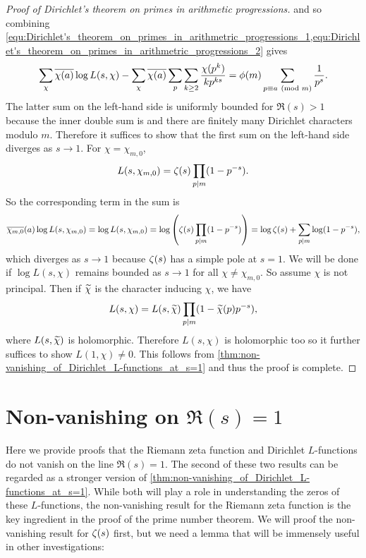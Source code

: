 \begin{proof}[Proof of Dirichlet's theorem on primes in arithmetic progressions]
          and so combining \cref{equ:Dirichlet's_theorem_on_primes_in_arithmetric_progressions_1,equ:Dirichlet's_theorem_on_primes_in_arithmetric_progressions_2} gives
          \[
            \sum_{\chi}\overline{\chi(a)}\log L(s,\chi)-\sum_{\chi}\overline{\chi(a)}\sum_{p}\sum_{k \ge 2}\frac{\chi(p^{k})}{kp^{ks}} = \phi(m)\sum_{p \equiv{a} \ \left(\text{mod }m\right)}\frac{1}{p^{s}}.
          \]
          The latter sum on the left-hand side is uniformly bounded for $\Re(s) > 1$ because the inner double sum is and there are finitely many Dirichlet characters modulo $m$. Therefore it suffices to show that the first sum on the left-hand side diverges as $s \to 1$. For $\chi = \chi_{m,0}$,
          \[
            L(s,\chi_{m,0}) = \zeta(s)\prod_{p \mid m}(1-p^{-s}).
          \]
          So the corresponding term in the sum is
          \[
            \overline{\chi_{m,0}}(a)\log L(s,\chi_{m,0}) = \log L(s,\chi_{m,0}) = \log\left(\zeta(s)\prod_{p \mid m}(1-p^{-s})\right) = \log\zeta(s)+\sum_{p \mid m}\log(1-p^{-s}),
          \]
          which diverges as $s \to 1$ because $\zeta(s)$ has a simple pole at $s = 1$. We will be done if $\log L(s,\chi)$ remains bounded as $s \to 1$ for all $\chi \neq \chi_{m,0}$. So assume $\chi$ is not principal. Then if $\widetilde{\chi}$ is the character inducing $\chi$, we have
          \[
            L(s,\chi) = L(s,\widetilde{\chi})\prod_{p \mid m}(1-\widetilde{\chi}(p)p^{-s}),
          \]
          where $L(s,\widetilde{\chi})$ is holomorphic. Therefore $L(s,\chi)$ is holomorphic too so it further suffices to show $L(1,\chi) \neq 0$. This follows from \cref{thm:non-vanishing_of_Dirichlet_L-functions_at_s=1} and thus the proof is complete.
      \end{proof}
    \section{Non-vanishing on \texorpdfstring{$\Re(s) = 1$}{\Re(s) = 1}}
      Here we provide proofs that the Riemann zeta function and Dirichlet $L$-functions do not vanish on the line $\Re(s) = 1$. The second of these two results can be regarded as a stronger version of \cref{thm:non-vanishing_of_Dirichlet_L-functions_at_s=1}. While both will play a role in understanding the zeros of these $L$-functions, the non-vanishing result for the Riemann zeta function is the key ingredient in the proof of the prime number theorem. We will proof the non-vanishing result for $\zeta(s)$ first, but we need a lemma that will be immensely useful in other investigations:

